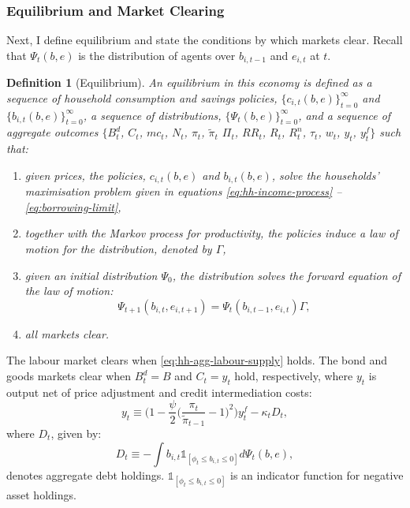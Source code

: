\documentclass[a4paper,12pt]{article} %
\numberwithin{equation}{section} %
\numberwithin{figure}{section}
\numberwithin{table}{section}
\newtheorem{definition}{Definition}
\begin{document}
\subsubsection{Equilibrium and Market Clearing}
\label{sec:model-eq}

Next, I define equilibrium and state the conditions by which markets clear. Recall that $\Psi_t (b,e)$ is the distribution of agents over $b_{i,t-1}$ and $e_{i,t}$ at $t$.

\begin{definition}[Equilibrium]
\label{def:eq}
An equilibrium in this economy is defined as a sequence of household consumption and savings policies, $\{ c_{i,t} (b, e) \}_{t=0}^{\infty}$ and $\{ b_{i,t} (b, e) \}_{t=0}^{\infty}$, a sequence of distributions, $\{ \Psi_t (b,e) \}_{t=0}^{\infty} $, and a sequence of aggregate outcomes $\{ B_t^d$, $C_t$, $mc_t$, $N_t$, $\pi_t$, $\tilde{\pi}_t$ $\Pi_t$, $RR_t$, $R_t$, $R_t^n$, $\tau_t$, $w_t$, $y_t$, $y_t^f \}$ such that:
\begin{enumerate}
    \item given prices, the policies, $c_{i,t} (b, e)$ and $b_{i,t} (b, e)$, solve the households' maximisation problem given in equations \eqref{eq:hh-income-process} -- \eqref{eq:borrowing-limit},
    \item together with the Markov process for productivity, the policies induce a law of motion for the distribution, denoted by $\Gamma$,
    \item given an initial distribution $\Psi_0$, the distribution solves the forward equation of the law of motion:
    \begin{equation*}
        \Psi_{t+1} (b_{i,t},e_{i,t+1}) = \Psi_{t} (b_{i,t-1},e_{i,t}) \Gamma,
    \end{equation*}
    \item all markets clear.
\end{enumerate}
\end{definition}

The labour market clears when \eqref{eq:hh-agg-labour-supply} holds. The bond and goods markets clear when $B_t^d = B$ and $C_t = y_t$ hold, respectively, where $y_t$ is output net of price adjustment and credit intermediation costs:
\begin{equation}
    y_t \equiv \Bigg( 1 - \frac{\psi}{2} \Bigg( \frac{\pi_t}{\tilde{\pi}_{t-1}} - 1 \Bigg)^2 \Bigg) y_t^f - \kappa_t D_t, \label{eq:effective-gdp}
\end{equation}
where $D_t$, given by:
\begin{equation}
    D_t \equiv - \int b_{i,t} \mathbb{1}_{[\phi_t \le b_{i,t} \le 0]} d \Psi_t (b,e), \label{eq:agg-debt}
\end{equation}
denotes aggregate debt holdings. $\mathbb{1}_{[\phi_t \le b_{i,t} \le 0]}$ is an indicator function for negative asset holdings.
\end{document}

